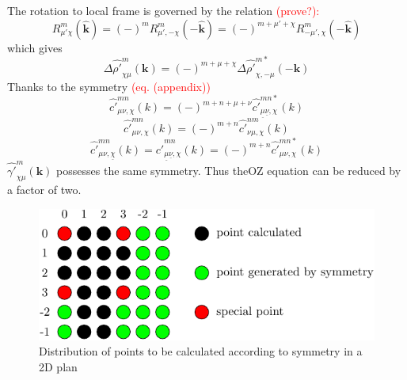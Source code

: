 The rotation to local frame is governed by the relation \textcolor{red}{(prove?):}
\begin{equation}
R_{\mu'\chi}^{m}(\hat{\mathbf{k}})=(-)^{m}R_{\mu',-\chi}^{m}(-\hat{\mathbf{k}})=(-)^{m+\mu'+\chi}R_{-\mu',\chi}^{m}(-\hat{\mathbf{k}})\label{eq:3}
\end{equation}
which gives
\begin{equation}
\Delta\hat{\rho'}_{\chi\mu}^{m}(\mathbf{k})=(-)^{m+\mu+\chi}\Delta\hat{\rho'}_{\chi,-\mu}^{m*}(-\mathbf{k})\label{eq:2}
\end{equation}
Thanks to the symmetry\textcolor{red}{{} (eq. (appendix))} 
\begin{equation}
\hat{c'}_{\mu\nu,\chi}^{mn}(k)=(-)^{m+n+\mu+\nu}\hat{c'}_{\underline{\mu}\underline{\nu},\chi}^{mn*}(k)
\end{equation}
\begin{equation}
\hat{c'}_{\mu\nu,\chi}^{mn}(k)=(-)^{m+n}\hat{c'}_{\nu\mu,\chi}^{nm}(k)
\end{equation}
\begin{equation}
\hat{c'}_{\mu\nu,\underline{\chi}}^{mn}(k)=\hat{c'}_{\underline{\mu}\underline{\nu},\chi}^{mn}(k)=(-)^{m+n}\hat{c'}_{\mu\nu,\chi}^{mn*}(k)
\end{equation}
$\hat{\gamma'}_{\chi\mu}^{m}(\mathbf{k})$ possesses the same symmetry.
Thus the\acs{OZ} equation can be reduced by a factor of two.

\begin{figure}[h]
\begin{centering}
\includegraphics{_figure/test_lmn}
\par\end{centering}
\caption{Distribution of points to be calculated according to symmetry in a
2D plan}
\end{figure}

